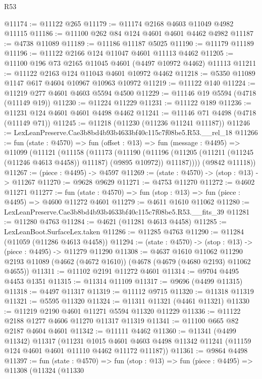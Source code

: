 \begin{lexlean}{R53}
\begin{coremodule}
@11174 := @11122 @265
@11179 := @11174 @2168 @4603 @11049 @4982 @11115
@11186 := @11100 @262 @84 @124 @4601 @4601 @4462 @4982
@11187 := @4738 @11089
@11189 := @11186 @11187 @5025
@11190 := @11179 @11189
@11196 := @11122 @2166 @124 @11047 @4601 @11113 @4462
@11205 := @11100 @196 @73 @2165 @11045 @4601 (@4497 @10972 @4462) @11113
@11211 := @11122 @2163 @124 @11043 @4601 @10972 @4462
@11218 := @5350 @11089 @1147 @617 @4604 @10967 @10963 @10972
@11219 := @11122 @140
@11224 := @11219 @277 @4601 @4603 @5594 @4500
@11229 := @11146 @19 @5594 (@4718 (@11149 @19))
@11230 := @11224 @11229
@11231 := @11122 @189
@11236 := @11231 @124 @4601 @4601 @4498 @4462
@11241 := @11146 @71 @4498 (@4718 (@11149 @71))
@11245 := @11218 (@11230 (@11236 @11241 @11187))
@11246 := LexLeanPreserve.Cae3b8bd4b93b4633bf40c115c7f08be5.R53.__rel_18
@11266 := fun (state : @4570) =>
  fun (offset : @13) =>
  fun (message : @4495) =>
  @11099
    (@11121
      (@11158
        (@11173
          (@11190
            (@11196 (@11205 (@11211 (@11245 (@11246 @4613 @4458)) @11187) (@9895 @10972)) @11187))))
      (@9842 @11118))
@11267 := (piece : @4495) -> @4597
@11269 := (state : @4570) -> (stop : @13) -> @11267
@11270 := @9628 @9629
@11271 := @4753 @11270
@11272 := @4602 @11271
@11277 := fun (state : @4570) => fun (stop : @13) => fun (piece : @4495) => @4600 @11272 @4601
@11279 := @4611 @1610 @11062
@11280 := LexLeanPreserve.Cae3b8bd4b93b4633bf40c115c7f08be5.R53.__fits_39
@11281 := @11280 @4763
@11284 := @4621 (@11281 @4613 @4458)
@11285 := LexLeanBoot.SurfaceLex.taken
@11286 := @11285 @4763
@11290 := @11284 (@11059 (@11286 @4613 @4458))
@11294 := (state : @4570) -> (stop : @13) -> (piece : @4495) -> @11279 @11290
@11308 := @4637
    @1610
    @11062
    @11290
    @2193
    @11089
    (@4662 (@4672 @1610))
    (@4678 (@4679 (@4680 @2193) @11062 @4655))
@11311 := @11102 @2191 @11272 @4601
@11314 := @9704 @4495 @4453 @1351
@11315 := @11314 @11109
@11317 := @9696 (@4499 @11315)
@11318 := @4497 @11317
@11319 := @11112 @9715
@11320 := @11318 @11319
@11321 := @5595 @11320
@11324 := @11311 @11321 (@4461 @11321)
@11330 := @11219 @2190 @4601 @11271 @5594 @11320 @11229
@11336 := @11122 @2188 @1277 @4606 @11270 @11317 @11319
@11341 := @11100 @665 @82 @2187 @4604 @4601
@11342 := @11111 @4462
@11360 := @11341
    (@4499 @11342)
    @11317
    (@11231
      @1015
      @4601
      @4603
      @4498
      @11342
      @11241
      (@11159 @124 @4601 @4601 @11110 @4462 @11172 @11187))
@11361 := @9864 @4498
@11397 := fun (state : @4570) =>
  fun (stop : @13) =>
  fun (piece : @4495) =>
  @11308
    (@11324
      (@11330

\end{coremodule}
\end{lexlean}
